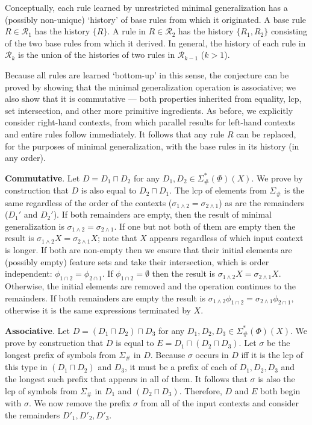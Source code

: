 \documentclass[11pt]{article}
\begin{document}
Conceptually, each rule learned by unrestricted minimal generalization has a (possibly non-unique) `history' of base rules from which it originated. A base rule $R \in \mathcal{R}_1$ has the history $\{ R \}$. A rule in $R \in \mathcal{R}_2$ has the history $\{ R_1, R_2 \}$ consisting of the two base rules from which it derived. In general, the history of each rule in $\mathcal{R}_k$ is the union of the histories of two rules in $\mathcal{R}_{k-1}$ ($k > 1$).

Because all rules are learned `bottom-up' in this sense, the conjecture can be proved by showing that the minimal generalization operation is associative; we also show that it is commutative --- both properties inherited from equality, lcp, set intersection, and other more primitive ingredients. As before, we explicitly consider right-hand contexts, from which parallel results for left-hand contexts and entire rules follow immediately. It follows that any rule $R$ can be replaced, for the purposes of minimal generalization, with the base rules in its history (in any order). 

\textbf{Commutative}. Let $D = D_1 \sqcap D_2$ for any $D_1, D_2 \in \Sigma_{\#}^*(\Phi)(X)$. We prove by construction that $D$ is also equal to $D_2 \sqcap D_1$. The lcp of elements from $\Sigma_{\#}$ is the same regardless of the order of the contexts ($\sigma_{1\land 2} = \sigma_{2\land 1}$) as are the remainders ($D_1'$ and $D_2'$). If both remainders are empty, then the result of minimal generalization is $\sigma_{1\land 2} = \sigma_{2\land 1}$. If one but not both of them are empty then the result is $\sigma_{1\land 2}X = \sigma_{2\land 1}X$; note that $X$ appears regardless of which input context is longer. If both are non-empty then we ensure that their initial elements are (possibly empty) feature sets and take their intersection, which is order independent: $\phi_{1\cap 2} = \phi_{2\cap 1}$. If $\phi_{1\cap 2} = \emptyset$ then the result is $\sigma_{1\land 2}X = \sigma_{2\land 1}X$. Otherwise, the initial elements are removed and the operation continues to the remainders. If both remainders are empty the result is $\sigma_{1\land 2}\phi_{1\cap 2} = \sigma_{2\land 1}\phi_{2\cap 1}$, otherwise it is the same expressions terminated by $X$.

\textbf{Associative}. Let $D = (D_1 \sqcap D_2) \sqcap D_3$ for any $D_1, D_2, D_3 \in \Sigma_{\#}^*(\Phi)(X)$. We prove by construction that $D$ is equal to $E = D_1 \sqcap (D_2 \sqcap D_3)$. Let $\sigma$ be the longest prefix of symbols from $\Sigma_{\#}$ in $D$. Because $\sigma$ occurs in $D$ iff it is the lcp of this type in $(D_1 \sqcap D_2)$ and $D_3$, it must be a prefix of each of $D_1, D_2, D_3$ and the longest such prefix that appears in all of them. It follows that $\sigma$ is also the lcp of symbols from $\Sigma_{\#}$ in $D_1$ and $(D_2 \sqcap D_3)$. Therefore, $D$ and $E$ both begin with $\sigma$. We now remove the prefix $\sigma$ from all of the input contexts and consider the remainders $D'_1, D'_2, D'_3$.
\end{document}
